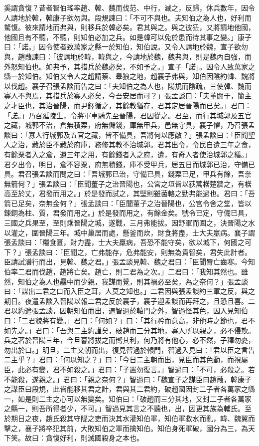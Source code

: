 \begin{pinyinscope}
奚謂貪愎？昔者智伯瑤率趙、韓、魏而伐范、中行，滅之，反歸，休兵數年，因令人請地於韓，韓康子欲勿與。段規諫曰：「不可不與也。夫知伯之為人也，好利而驁愎。彼來請地而弗與，則移兵於韓必矣。君其與之。與之彼狃，又將請地他國，他國且有不聽，不聽，則知伯必加之兵。如是韓可以免於患而待其事之變。」康子曰：「諾。」因令使者致萬家之縣一於知伯，知伯說。又令人請地於魏，宣子欲勿與，趙葭諫曰：「彼請地於韓，韓與之，今請地於魏，魏弗與，則是魏內自強，而外怒知伯也。如弗予，其措兵於魏必矣，不如予之。」宣子「諾」。因令人致萬家之縣一於知伯。知伯又令人之趙請蔡、皋狼之地，趙襄子弗與，知伯因陰約韓、魏將以伐趙。襄子召張孟談而告之曰：「夫知伯之為人也，陽規而陰疏，三使韓、魏而寡人不與焉，其措兵於寡人必矣，今吾安居而可？」張孟談曰：「夫董閼于，簡主之才臣也，其治晉陽，而尹鐸循之，其餘教猶存，君其定居晉陽而已矣。」君曰：「諾。」乃召延陵生，令將軍車騎先至晉陽，君因從之。君至，而行其城郭及五官之藏，城郭不治，倉無積粟，府無儲錢，庫無甲兵，邑無守具，襄子懼，乃召張孟談曰：「寡人行城郭及五官之藏，皆不備具，吾將何以應敵？」張孟談曰：「臣聞聖人之治，藏於臣不藏於府庫，務修其教不治城郭。君其出令，令民自遺三年之食，有餘粟者入之倉，遺三年之用，有餘錢者入之府，遺，有奇人者使治城郭之繕。」君夕出令，明日，倉不容粟，府無積錢，庫不受甲兵，居五日而城郭已治，守備已具。君召張孟談而問之曰：「吾城郭已治，守備已具，錢粟已足，甲兵有餘，吾奈無箭何？」張孟談曰：「臣聞董子之治晉陽也，公宮之垣皆以荻蒿楛楚牆之，有楛高至於丈，君發而用之。」於是發而試之，其堅則雖菌輅之勁弗能過也。君曰：「吾箭已足矣，奈無金何？」張孟談曰：「臣聞董子之治晉陽也，公宮令舍之堂，皆以鍊銅為柱、質，君發而用之。」於是發而用之，有餘金矣。號令已定，守備已具，三國之兵果至，至則乘晉陽之城，遂戰，三月弗能拔。因舒軍而圍之，決晉陽之水以灌之，圍晉陽三年。城中巢居而處，懸釜而炊，財食將盡，士大夫羸病。襄子謂張孟談曰：「糧食匱，財力盡，士大夫羸病，吾恐不能守矣，欲以城下，何國之可下？」張孟談曰：「臣聞之，亡弗能存，危弗能安，則無為貴智矣，君失此計者。臣請試潛行而出，見韓、魏之君。」張孟談見韓、魏之君曰：「臣聞脣亡齒寒。今知伯率二君而伐趙，趙將亡矣。趙亡，則二君為之次。」二君曰：「我知其然也。雖然，知伯之為人也麤中而少親，我謀而覺，則其禍必至矣，為之奈何？」張孟談曰：「謀出二君之口而入臣之耳，人莫之知也。」二君因與張孟談約三軍之反，與之期日。夜遣孟談入晉陽以報二君之反於襄子，襄子迎孟談而再拜之，且恐且喜。二君以約遣張孟談，因朝知伯而出，遇智過於轅門之外，智過怪其色，因入見知伯曰：「二君貌將有變。」君曰：「何如？」曰：「其行矜而意高，非他時之節也，君不如先之。」君曰：「吾與二主約謹矣，破趙而三分其地，寡人所以親之，必不侵欺。兵之著於晉陽三年，今旦暮將拔之而嚮其利，何乃將有他心，必不然，子釋勿憂，勿出於口。」明旦，二主又朝而出，復見智過於轅門，智過入見曰：「君以臣之言告二主乎？」君曰：「何以知之？」曰：「今日二主朝而出，見臣而其色動，而視屬臣，此必有變，君不如殺之。」君曰：「子置勿復言。」智過曰：「不可，必殺之。若不能殺，遂親之。」君曰：「親之奈何？」智過曰：「魏宣子之謀臣曰趙葭，韓康子之謀臣曰段規，此皆能移其君之計，君與其二君約，破趙國因封二子者各萬家之縣一，如是則二主之心可以無變矣。知伯曰：「破趙而三分其地，又封二子者各萬家之縣一，則吾所得者少，不可。」智過見其言之不聽也，出，因更其族為輔氏。至於期日之夜，趙氏殺其守隄之吏而決其水灌知伯軍，知伯軍救水而亂，韓、魏翼而擊之，襄子將卒犯其前，大敗知伯之軍而擒知伯。知伯身死軍破，國分為三，為天下笑。故曰：貪愎好利，則滅國殺身之本也。


\end{pinyinscope}

